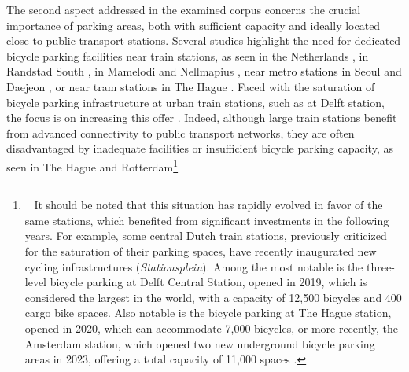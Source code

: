 \begin{refsegment}
The second aspect addressed in the examined corpus concerns the crucial importance of parking areas, both with sufficient capacity and ideally located close to public transport stations. Several studies highlight the need for dedicated bicycle parking facilities near train stations, as seen in the Netherlands \textcolor{blue}{\autocite[75]{rietveld_accessibility_2000}}, in Randstad South \textcolor{blue}{\autocite[11]{geurs_multi-modal_2016}}, in Mamelodi and Nellmapius \textcolor{blue}{\autocite[40]{bechstein_cycling_2010}}, near metro stations in Seoul and Daejeon \textcolor{blue}{\autocites[53]{lee_strategies_2010}[982]{lee_bicycle-based_2016}}, or near tram stations in The Hague \textcolor{blue}{\autocite[833]{ton_understanding_2020}}. Faced with the saturation of bicycle parking infrastructure at urban train stations, such as at Delft station, the focus is on increasing this offer \textcolor{blue}{\autocite[9-10]{molin_bicycle_2015}}. Indeed, although large train stations benefit from advanced connectivity to public transport networks, they are often disadvantaged by inadequate facilities or insufficient bicycle parking capacity, as seen in The Hague and Rotterdam\footnote{~
    It should be noted that this situation has rapidly evolved in favor of the same stations, which benefited from significant investments in the following years. For example, some central Dutch train stations, previously criticized for the saturation of their parking spaces, have recently inaugurated new cycling infrastructures (\textsl{Stationsplein}). Among the most notable is the three-level bicycle parking at Delft Central Station, opened in 2019, which is considered the largest in the world, with a capacity of 12,500 bicycles and 400 cargo bike spaces. Also notable is the bicycle parking at The Hague station, opened in 2020, which can accommodate 7,000 bicycles, or more recently, the Amsterdam station, which opened two new underground bicycle parking areas in 2023, offering a total capacity of 11,000 spaces \textcolor{blue}{\autocite[]{bicycle_dutch_underground_2023}}.
}
\end{refsegment}
